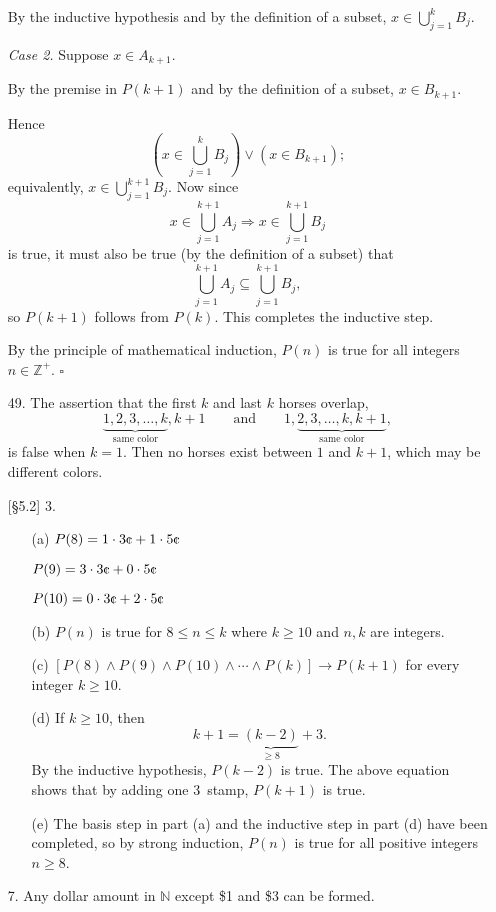 \documentclass{article}
\begin{document}
\begin{enumerate}
    \hspace{0.25in} By the inductive hypothesis and by the definition of a subset, $x \in \bigcup_{j=1}^{k} B_j$.

    \textit{Case 2.} Suppose $x \in A_{k+1}$.

    \hspace{0.25in} By the premise in $P(k+1)$ and by the definition of a subset, $x \in B_{k+1}$.

    \vspace{0.25in}

    Hence
    \[
    \left( x \in \bigcup_{j=1}^{k} B_j \right) \lor \left( x \in B_{k+1} \right);
    \]
    equivalently, $x \in \bigcup_{j=1}^{k+1} B_j$. Now since
    \[
    x \in \bigcup_{j=1}^{k+1} A_j \Rightarrow x \in \bigcup_{j=1}^{k+1} B_j
    \]
    is true, it must also be true (by the definition of a subset) that
    \[
    \bigcup_{j=1}^{k+1} A_j \subseteq \bigcup_{j=1}^{k+1} B_j,
    \]
    so $P(k+1)$ follows from $P(k)$. This completes the inductive step.

    By the principle of mathematical induction, $P(n)$ is true for all integers $n \in \mathbb{Z}^+$. $\square$
    \item[49.] The assertion that the first $k$ and last $k$ horses overlap,
    \[
    \underbrace{1, 2, 3, \ldots, k}_{\text{same color}}, k+1 \qquad\text{and}\qquad 1, \underbrace{2, 3, \ldots, k, k+1}_{\text{same color}},
    \]
    is false when $k=1$. Then no horses exist between $1$ and $k+1$, which may be different colors.
    \item[{[\S 5.2]} 3.]
        \begin{itemize}
            \item[(a)] $P(8) = 1\cdot 3\text{\textcent} + 1 \cdot 5\text{\textcent}$

            $P(9) = 3 \cdot 3\text{\textcent} + 0 \cdot 5\text{\textcent}$

            $P(10) = 0 \cdot 3\text{\textcent} + 2 \cdot 5\text{\textcent}$
            \item[(b)] $P(n)$ is true for $8 \le n \le k$ where $k \ge 10$ and $n,k$ are integers.
            \item[(c)] $[P(8) \land P(9) \land P(10) \land \cdots \land P(k)] \rightarrow P(k+1)$ for every integer $k \ge 10$.
            \item[(d)] If $k \ge 10$, then
            \[
            k+1 = \underbrace{(k-2)}_{\ge 8}+3.
            \]
            By the inductive hypothesis, $P(k-2)$ is true. The above equation shows that by adding one 3\textcent\, stamp, $P(k+1)$ is true.
            \item[(e)] The basis step in part (a) and the inductive step in part (d) have been completed, so by strong induction, $P(n)$ is true for all positive integers $n \ge 8$.
        \end{itemize}
    \item[7.] Any dollar amount in $\mathbb{N}$ except \$1 and \$3 can be formed.


\end{enumerate}
\end{document}
